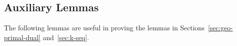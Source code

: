     

\subsection{Auxiliary Lemmas}
The following lemmas are useful in proving the lemmas in Sections~\ref{sec:geo-primal-dual} and~\ref{sec:k-seq}.


